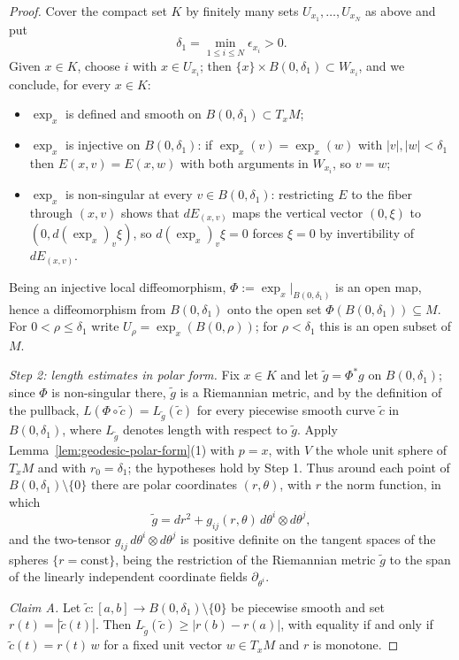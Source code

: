\begin{proof}
Cover the compact set $K$ by finitely many sets
$U_{x_1},\ldots,U_{x_N}$ as above and put
$$\delta_1=\min_{1\le i\le N}\epsilon_{x_i}>0.$$
Given $x\in K$, choose $i$ with $x\in U_{x_i}$; then
$\{x\}\times B(0,\delta_1)\subset W_{x_i}$, and we conclude, for
every $x\in K$:
\begin{itemize}
\item $\exp_x$ is defined and smooth on $B(0,\delta_1)\subset
T_xM$;
\item $\exp_x$ is injective on $B(0,\delta_1)$: if
$\exp_x(v)=\exp_x(w)$ with $|v|,|w|<\delta_1$ then
$E(x,v)=E(x,w)$ with both arguments in $W_{x_i}$, so $v=w$;
\item $\exp_x$ is non-singular at every $v\in B(0,\delta_1)$:
restricting $E$ to the fiber through $(x,v)$ shows that
$dE_{(x,v)}$ maps the vertical vector $(0,\xi)$ to
$(0,d(\exp_x)_v\xi)$, so $d(\exp_x)_v\xi=0$ forces $\xi=0$ by
invertibility of $dE_{(x,v)}$.
\end{itemize}
Being an injective local diffeomorphism, $\Phi:=
\exp_x|_{B(0,\delta_1)}$ is an open map, hence a diffeomorphism
from $B(0,\delta_1)$ onto the open set
$\Phi(B(0,\delta_1))\subseteq M$. For $0<\rho\le\delta_1$ write
$U_\rho=\exp_x(B(0,\rho))$; for $\rho<\delta_1$ this is an open
subset of $M$.

\emph{Step 2: length estimates in polar form.} Fix $x\in K$ and
let $\tilde g=\Phi^*g$ on $B(0,\delta_1)$; since $\Phi$ is
non-singular there, $\tilde g$ is a Riemannian metric, and by the
definition of the pullback,
$L(\Phi\circ\tilde c)=L_{\tilde g}(\tilde c)$ for every piecewise
smooth curve $\tilde c$ in $B(0,\delta_1)$, where $L_{\tilde g}$
denotes length with respect to $\tilde g$. Apply
Lemma~\ref{lem:geodesic-polar-form}(1) with $p=x$, with $V$ the
whole unit sphere of $T_xM$ and with $r_0=\delta_1$; the
hypotheses hold by Step 1. Thus around each point of
$B(0,\delta_1)\setminus\{0\}$ there are polar coordinates
$(r,\theta)$, with $r$ the norm function, in which
$$\tilde g=dr^2+g_{ij}(r,\theta)\,d\theta^i\otimes d\theta^j,$$
and the two-tensor $g_{ij}\,d\theta^i\otimes d\theta^j$ is
positive definite on the tangent spaces of the spheres
$\{r=\mathrm{const}\}$, being the restriction of the Riemannian
metric $\tilde g$ to the span of the linearly independent
coordinate fields $\partial_{\theta^i}$.

\emph{Claim A.} Let $\tilde c\colon[a,b]\to
B(0,\delta_1)\setminus\{0\}$ be piecewise smooth and set
$r(t)=|\tilde c(t)|$. Then
$L_{\tilde g}(\tilde c)\ge|r(b)-r(a)|$, with equality if and only
if $\tilde c(t)=r(t)\,w$ for a fixed unit vector $w\in T_xM$ and
$r$ is monotone.


\end{proof}
